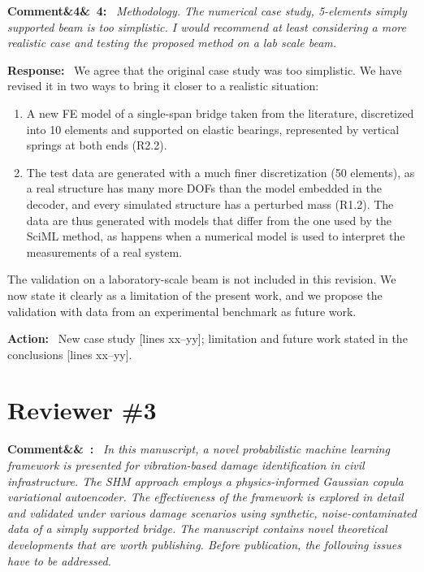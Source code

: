\documentclass[11pt]{article}
\newenvironment{rcomment}[1]{\par\bigskip\noindent\textbf{Comment\ifx&#1&\else\ #1\fi:}\ \itshape}{\par}
\newenvironment{response}{\par\smallskip\noindent\color{resp}\textbf{Response:}\ }{\par}
\newenvironment{action}{\par\smallskip\noindent\color{resp}\textbf{Action:}\ }{\par}
\newcommand{\tbd}[1]{\textcolor{note}{\textsf{[#1]}}}
\newcommand{\lines}[1]{\tbd{lines #1}}
\begin{document}
\begin{rcomment}{4}
Methodology. The numerical case study, 5-elements simply supported beam is too simplistic. I would recommend at least
considering a more realistic case and testing the proposed method on a lab scale beam.
\end{rcomment}

\begin{response}
We agree that the original case study was too simplistic. We have revised it in two ways to bring it closer to a
realistic situation:
\begin{enumerate}[leftmargin=*,label=(\arabic*)]
\item A new FE model of a single-span bridge taken from the literature, discretized into 10 elements and supported on
elastic bearings, represented by vertical springs at both ends (R2.2).
\item The test data are generated with a much finer discretization (50 elements), as a real structure has many more DOFs
than the model embedded in the decoder, and every simulated structure has a perturbed mass (R1.2). The data are thus
generated with models that differ from the one used by the SciML method, as happens when a numerical model is used to
interpret the measurements of a real system.
\end{enumerate}
The validation on a laboratory-scale beam is not included in this revision. We now state it clearly as a limitation of the
present work, and we propose the validation with data from an experimental benchmark as future work.
\end{response}

\begin{action}
New case study \lines{xx--yy}; limitation and future work stated in the conclusions \lines{xx--yy}.
\end{action}

\section{Reviewer \#3}

\begin{rcomment}{}
In this manuscript, a novel probabilistic machine learning framework is presented for vibration-based damage
identification in civil infrastructure. The SHM approach employs a physics-informed Gaussian copula variational
autoencoder. The effectiveness of the framework is explored in detail and validated under various damage scenarios
using synthetic, noise-contaminated data of a simply supported bridge. The manuscript contains novel theoretical
developments that are worth publishing. Before publication, the following issues have to be addressed.
\end{rcomment}
\end{document}
